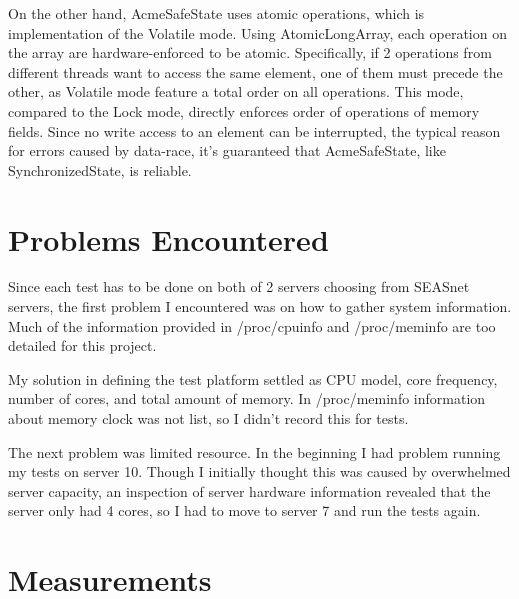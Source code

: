 \documentclass[letterpaper,twocolumn,10pt]{article}
\begin{document}
On the other hand, AcmeSafeState uses atomic operations, which is implementation of the Volatile mode. 
Using AtomicLongArray, each operation on the array are hardware-enforced to be atomic.
Specifically, if 2 operations from different threads want to access the same element, one of them must precede the other, as Volatile mode feature a total order on all operations.
This mode, compared to the Lock mode, directly enforces order of operations of memory fields.
Since no write access to an element can be interrupted, the typical reason for errors caused by data-race, it's guaranteed that AcmeSafeState, like SynchronizedState, is reliable.

\section{Problems Encountered}

Since each test has to be done on both of 2 servers choosing from SEASnet servers, the first problem I encountered was on how to gather system information.
Much of the information provided in /proc/cpuinfo and /proc/meminfo are too detailed for this project. 

My solution in defining the test platform settled as CPU model, core frequency, number of cores, 
and total amount of memory.
In /proc/meminfo information about memory clock was not list, so I didn't record this for tests.

The next problem was limited resource. 
In the beginning I had problem running my tests on server 10.
Though I initially thought this was caused by overwhelmed server capacity, an inspection of server hardware information revealed that the server only had 4 cores,
so I had to move to server 7 and run the tests again.

\section{Measurements}
\end{document}
